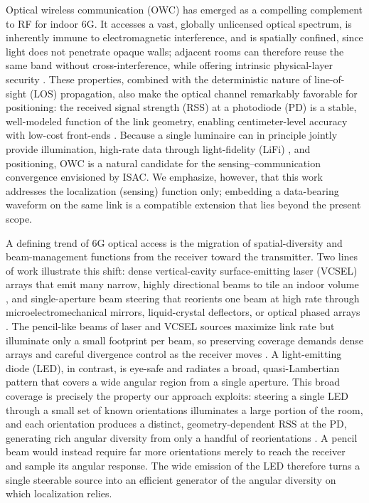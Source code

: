\documentclass[journal]{IEEEtran}
\begin{document}
Optical wireless communication (OWC) has emerged as a compelling complement to RF for indoor 6G. It accesses a vast, globally unlicensed optical spectrum, is inherently immune to electromagnetic interference, and is spatially confined, since light does not penetrate opaque walls; adjacent rooms can therefore reuse the same band without cross-interference, while offering intrinsic physical-layer security \cite{Haas:16, Zhu2025}. These properties, combined with the deterministic nature of line-of-sight (LOS) propagation, also make the optical channel remarkably favorable for positioning: the received signal strength (RSS) at a photodiode (PD) is a stable, well-modeled function of the link geometry, enabling centimeter-level accuracy with low-cost front-ends \cite{Zhu2025, Wang2024b}. Because a single luminaire can in principle jointly provide illumination, high-rate data through light-fidelity (LiFi) \cite{Haas:16, Soltani2023LiFi2}, and positioning, OWC is a natural candidate for the sensing--communication convergence envisioned by ISAC. We emphasize, however, that this work addresses the localization (sensing) function only; embedding a data-bearing waveform on the same link is a compatible extension that lies beyond the present scope.

A defining trend of 6G optical access is the migration of spatial-diversity and beam-management functions from the receiver toward the transmitter. Two lines of work illustrate this shift: dense vertical-cavity surface-emitting laser (VCSEL) arrays that emit many narrow, highly directional beams to tile an indoor volume \cite{Zeng2022VCSEL, Safi2025VCSEL3D}, and single-aperture beam steering that reorients one beam at high rate through microelectromechanical mirrors, liquid-crystal deflectors, or optical phased arrays \cite{Liu:25, mi13070990, SaidEroglu2018, Koonen2021}. The pencil-like beams of laser and VCSEL sources maximize link rate but illuminate only a small footprint per beam, so preserving coverage demands dense arrays and careful divergence control as the receiver moves \cite{Safi2025VCSEL3D}. A light-emitting diode (LED), in contrast, is eye-safe and radiates a broad, quasi-Lambertian pattern that covers a wide angular region from a single aperture. This broad coverage is precisely the property our approach exploits: steering a single LED through a small set of known orientations illuminates a large portion of the room, and each orientation produces a distinct, geometry-dependent RSS at the PD, generating rich angular diversity from only a handful of reorientations \cite{acuna2025model, acuna2026broadcast}. A pencil beam would instead require far more orientations merely to reach the receiver and sample its angular response. The wide emission of the LED therefore turns a single steerable source into an efficient generator of the angular diversity on which localization relies.
\end{document}

